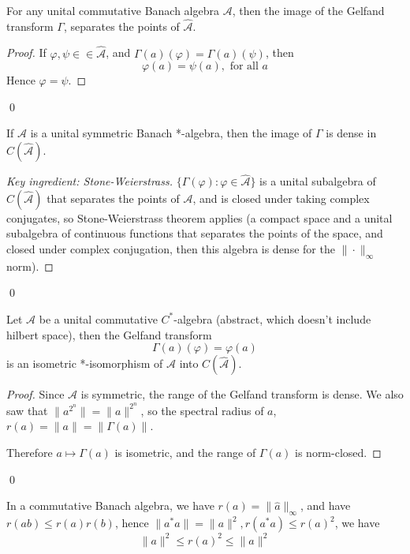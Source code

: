 For any unital commutative Banach algebra $\mathcal{A}$, then the image of the Gelfand transform $\Gamma$, separates the points of $\widehat{\mathcal{A}}$.

\begin{proof}
    If $\varphi,\psi\in\in\widehat{\mathcal{A}}$, and $\Gamma(a)(\varphi)=\Gamma(a)(\psi)$, then 
    \begin{equation*}
        \varphi(a)=\psi(a), \text{ for all } a
    \end{equation*}
    Hence $\varphi=\psi$.
\end{proof}
\qed

\begin{proposition}
    If $\mathcal{A}$ is a unital symmetric Banach *-algebra, then the image of $\Gamma$ is dense in $C(\widehat{\mathcal{A}})$.
\end{proposition}
\begin{proof}[Key ingredient: Stone-Weierstrass]
    $\{\Gamma(\varphi):\varphi\in\widehat{\mathcal{A}}\}$ is a unital subalgebra of $C(\widehat{\mathcal{A}})$ that separates the points of $\mathcal{A}$, and is closed under taking complex conjugates, so Stone-Weierstrass theorem applies (a compact space and a unital subalgebra of continuous functions that separates the points of the space, and closed under complex conjugation, then this algebra is dense for the $\|\cdot\|_\infty$ norm).
\end{proof}
\qed

\begin{theorem}
    Let $\mathcal{A}$ be a unital commutative $C^*$-algebra (abstract, which doesn't include hilbert space), then the Gelfand transform
    \begin{equation*}
        \Gamma(a)(\varphi)=\varphi(a)
    \end{equation*}
    is an isometric *-isomorphism of $\mathcal{A}$ into $C(\widehat{\mathcal{A}})$.    
\end{theorem}
\begin{proof}
    Since $\mathcal{A}$ is symmetric, the range of the Gelfand transform is dense. We also saw that $\|a^{2^n}\|=\|a\|^{2^n}$, so the spectral radius of $a$, $r(a)=\|a\|=\|\Gamma(a)\|$. 

    Therefore $a\mapsto\Gamma(a)$ is isometric, and the range of $\Gamma(a)$ is norm-closed.
\end{proof}
\qed

\begin{remark}
    In a commutative Banach algebra, we have $r(a)=\|\widehat{a}\|_\infty$, and have $r(ab)\leq r(a)r(b)$, hence $\|a^*a\|=\|a\|^2, r(a^*a)\leq r(a)^2$, we have
    \begin{equation*}
        \|a\|^2\leq r(a)^2\leq \|a\|^2
    \end{equation*}
\end{remark}

